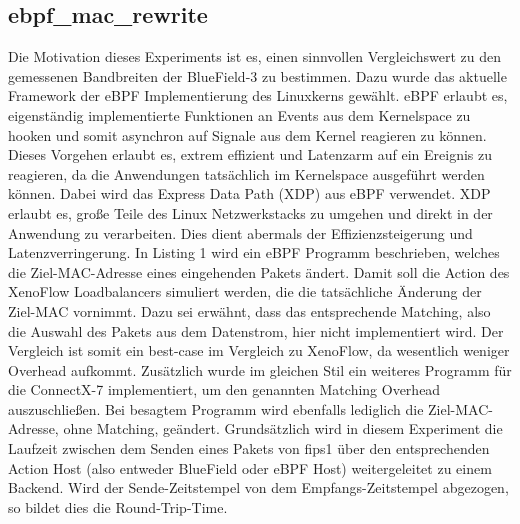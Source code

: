 \documentclass[paper=a4, fontsize=11pt]{scrartcl} %
\numberwithin{equation}{section} %
\numberwithin{figure}{section} %
\numberwithin{table}{section} %
\begin{document}
\subsection{ebpf\_mac\_rewrite}
Die Motivation dieses Experiments ist es, einen sinnvollen Vergleichswert zu den gemessenen Bandbreiten der BlueField-3 zu bestimmen. Dazu wurde das aktuelle Framework der eBPF Implementierung des Linuxkerns gewählt. eBPF erlaubt es, eigenständig implementierte Funktionen an Events aus dem Kernelspace zu hooken und somit asynchron auf Signale aus dem Kernel reagieren zu können. Dieses Vorgehen erlaubt es, extrem effizient und Latenzarm auf ein Ereignis zu reagieren, da die Anwendungen tatsächlich im Kernelspace ausgeführt werden können. Dabei wird das Express Data Path (XDP) aus eBPF verwendet. XDP erlaubt es, große Teile des Linux Netzwerkstacks zu umgehen und direkt in der Anwendung zu verarbeiten. Dies dient abermals der Effizienzsteigerung und Latenzverringerung. In Listing 1 wird ein eBPF Programm beschrieben, welches die Ziel-MAC-Adresse eines eingehenden Pakets ändert. Damit soll die Action des XenoFlow Loadbalancers simuliert werden, die die tatsächliche Änderung der Ziel-MAC vornimmt. Dazu sei erwähnt, dass das entsprechende Matching, also die Auswahl des Pakets aus dem Datenstrom, hier nicht implementiert wird. Der Vergleich ist somit ein best-case im Vergleich zu XenoFlow, da wesentlich weniger Overhead aufkommt. Zusätzlich wurde im gleichen Stil ein weiteres Programm für die ConnectX-7 implementiert, um den genannten Matching Overhead auszuschließen. Bei besagtem Programm wird ebenfalls lediglich die Ziel-MAC-Adresse, ohne Matching, geändert. Grundsätzlich wird in diesem Experiment die Laufzeit zwischen dem Senden eines Pakets von fips1 über den entsprechenden Action Host (also entweder BlueField oder eBPF Host) weitergeleitet zu einem Backend. Wird der Sende-Zeitstempel von dem Empfangs-Zeitstempel abgezogen, so bildet dies die Round-Trip-Time. \newpage
\label{code:ebpf-code}
\end{document}
